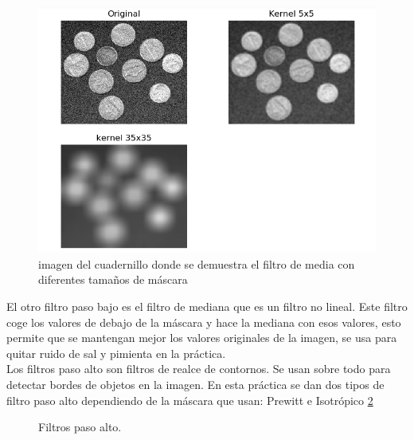 \documentclass[a4paper,12pt]{report}
\begin{document}
\begin{figure}[h]
\centering
\includegraphics[width=1\textwidth]{imagenes/filtromedia}
\caption{imagen del cuadernillo donde se demuestra el filtro de media con diferentes tamaños de máscara}
\label{filtromedia}
\end{figure}

El otro filtro paso bajo es el filtro de mediana que es un filtro no lineal. Este filtro coge los valores de debajo de la máscara y  hace la mediana con esos valores, esto permite que se mantengan mejor los valores originales de la imagen, se usa para quitar ruido de sal y pimienta en la práctica.\\

Los filtros paso alto son filtros de realce de contornos. Se usan sobre todo para detectar bordes de objetos en la imagen. En esta práctica se dan dos tipos de filtro paso alto dependiendo de la máscara que usan: Prewitt e Isotrópico \ref{fpa}

\begin{figure}[!tbp]
  \centering
  \hfill
  \caption{Filtros paso alto.}
  \label{fpa}
\end{figure}
\end{document}
